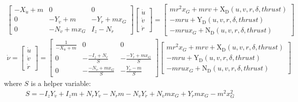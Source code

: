 \documentclass[review]{elsarticle}
\begin{document}
\begin{equation}\label{equation:02.01_VMMs:eqqsystem}
\begin{split}\displaystyle \left[\begin{matrix}- X_{\dot{u}} + m & 0 & 0\\0 & - Y_{\dot{v}} + m & - Y_{\dot{r}} + m x_{G}\\0 & - N_{\dot{v}} + m x_{G} & I_{z} - N_{\dot{r}}\end{matrix}\right] \left[\begin{matrix}\dot{u}\\\dot{v}\\\dot{r}\end{matrix}\right] = \left[\begin{matrix}m r^{2} x_{G} + m r v + \operatorname{X_{D}}{\left(u,v,r,\delta,thrust \right)}\\- m r u + \operatorname{Y_{D}}{\left(u,v,r,\delta,thrust \right)}\\- m r u x_{G} + \operatorname{N_{D}}{\left(u,v,r,\delta,thrust \right)}\end{matrix}\right]\end{split}
\end{equation}\begin{equation}\label{equation:02.01_VMMs:eqacc}
\begin{split}\displaystyle \dot{\nu} = \left[\begin{matrix}\dot{u}\\\dot{v}\\\dot{r}\end{matrix}\right] = \left[\begin{matrix}\frac{1}{- X_{\dot{u}} + m} & 0 & 0\\0 & - \frac{- I_{z} + N_{\dot{r}}}{S} & - \frac{- Y_{\dot{r}} + m x_{G}}{S}\\0 & - \frac{- N_{\dot{v}} + m x_{G}}{S} & - \frac{Y_{\dot{v}} - m}{S}\end{matrix}\right] \left[\begin{matrix}m r^{2} x_{G} + m r v + \operatorname{X_{D}}{\left(u,v,r,\delta,thrust \right)}\\- m r u + \operatorname{Y_{D}}{\left(u,v,r,\delta,thrust \right)}\\- m r u x_{G} + \operatorname{N_{D}}{\left(u,v,r,\delta,thrust \right)}\end{matrix}\right]\end{split}
\end{equation}
\sphinxAtStartPar
where \(S\) is a helper variable:
\begin{equation}\label{equation:02.01_VMMs:eq_S}
\begin{split}\displaystyle S = - I_{z} Y_{\dot{v}} + I_{z} m + N_{\dot{r}} Y_{\dot{v}} - N_{\dot{r}} m - N_{\dot{v}} Y_{\dot{r}} + N_{\dot{v}} m x_{G} + Y_{\dot{r}} m x_{G} - m^{2} x_{G}^{2}\end{split}
\end{equation}
\end{document}
